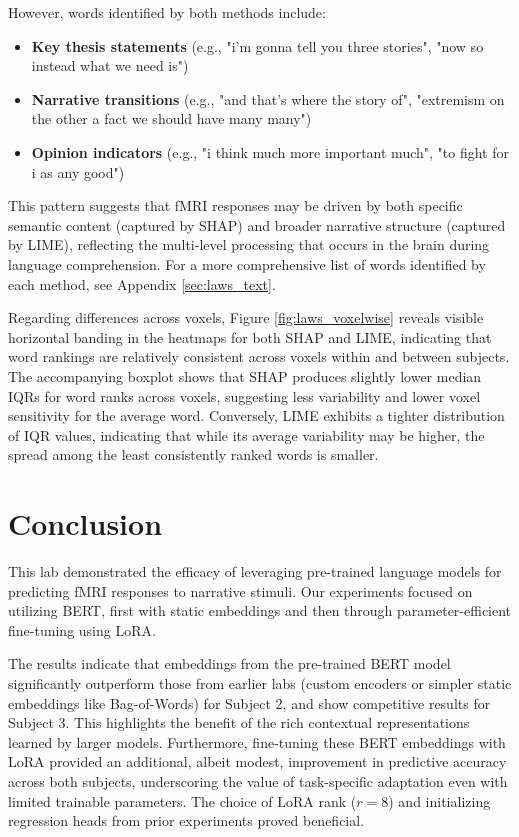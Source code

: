 \documentclass[10pt,letterpaper]{article}
\begin{document}
\newpage

However, words identified by both methods include:
\begin{itemize}
    \item \textbf{Key thesis statements} (e.g., "i'm gonna tell you three stories", "now so instead what we need is")
    \item \textbf{Narrative transitions} (e.g., "and that's where the story of", "extremism on the other a fact we should have many many")
    \item \textbf{Opinion indicators} (e.g., "i think much more important much", "to fight for i as any good")
\end{itemize}

This pattern suggests that fMRI responses may be driven by both specific semantic content (captured by SHAP) and broader narrative structure (captured by LIME), reflecting the multi-level processing that occurs in the brain during language comprehension. For a more comprehensive list of words identified by each method, see Appendix \ref{sec:laws_text}.

Regarding differences across voxels, Figure \ref{fig:laws_voxelwise} reveals visible horizontal banding in the heatmaps for both SHAP and LIME, indicating that word rankings are relatively consistent across voxels within and between subjects. The accompanying boxplot shows that SHAP produces slightly lower median IQRs for word ranks across voxels, suggesting less variability and lower voxel sensitivity for the average word. Conversely, LIME exhibits a tighter distribution of IQR values, indicating that while its average variability may be higher, the spread among the least consistently ranked words is smaller.



\section{Conclusion}

This lab demonstrated the efficacy of leveraging pre-trained language models for predicting fMRI responses to narrative stimuli. Our experiments focused on utilizing BERT, first with static embeddings and then through parameter-efficient fine-tuning using LoRA.

The results indicate that embeddings from the pre-trained BERT model significantly outperform those from earlier labs (custom encoders or simpler static embeddings like Bag-of-Words) for Subject 2, and show competitive results for Subject 3. This highlights the benefit of the rich contextual representations learned by larger models. Furthermore, fine-tuning these BERT embeddings with LoRA provided an additional, albeit modest, improvement in predictive accuracy across both subjects, underscoring the value of task-specific adaptation even with limited trainable parameters. The choice of LoRA rank (\(r=8\)) and initializing regression heads from prior experiments proved beneficial.
\end{document}
